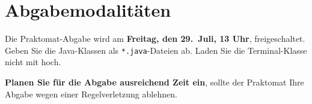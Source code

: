 \section*{Abgabemodalitäten}
Die Praktomat-Abgabe wird am \textbf{Freitag, den 29.~Juli, 13 Uhr},
freigeschaltet.
Geben Sie die Java-Klassen als \texttt{*.java}-Dateien ab.
Laden Sie die Terminal-Klasse nicht mit hoch.

\textbf{Planen Sie für die Abgabe ausreichend Zeit ein}, sollte der Praktomat Ihre Abgabe wegen einer Regelverletzung ablehnen.